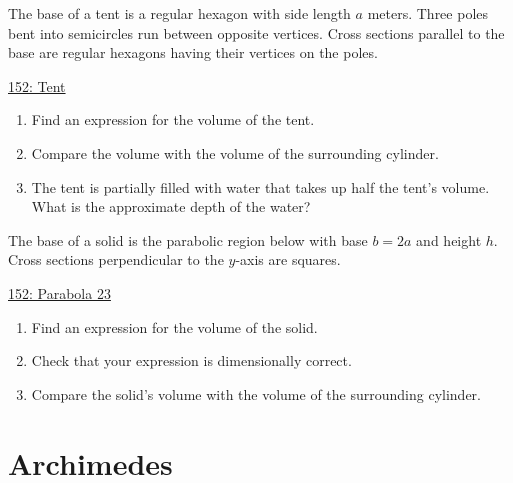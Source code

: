 \documentclass{ximera}
\begin{document}
\begin{question} \label{Q88rew3efds}

The base of a tent is a regular hexagon with side length $a$ meters. Three poles bent into semicircles run between opposite vertices. Cross sections parallel to the base are regular hexagons having their vertices on the poles.

\begin{onlineOnly}
    \begin{center}
\end{center}
\end{onlineOnly}

\href{https://www.desmos.com/3d/wczn2fml4l}{152: Tent}

\begin{enumerate}
\item Find an expression for the volume of the tent.

\item Compare the volume with the volume of the surrounding cylinder.

\item The tent is partially filled with water that takes up half the tent's volume. What is the approximate depth of the water?

\end{enumerate}


\end{question}




\begin{question} \label{QLkdfmmdf}
The base of a solid is the parabolic region below with base $b=2a$ and height $h$. Cross sections perpendicular to the $y$-axis are squares.



\begin{onlineOnly}
    \begin{center}
\end{center}
\end{onlineOnly}

\href{ https://www.desmos.com/calculator/mbxrsmdho8}{152: Parabola 23}
\begin{enumerate}

\item Find an expression for the volume of the solid. 

\item Check that your expression is dimensionally correct.

\item Compare the solid's volume with the volume of the surrounding cylinder.


\end{enumerate}
\end{question}

\section{Archimedes}
\end{document}
